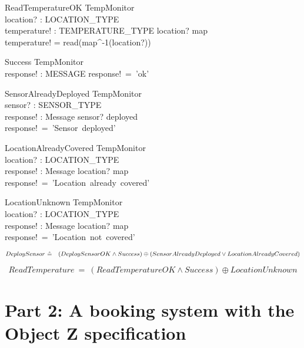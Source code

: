 \documentclass[12pt]{article}
\begin{document}
\begin{schema}{ReadTemperatureOK}
\Xi TempMonitor\\
location? : LOCATION\_TYPE\\
temperature! : TEMPERATURE\_TYPE
\where
location? \in \ran map\\
temperature! = read(map^{-1}(location?))\\
\end{schema}

\begin{schema}{Success}
\Xi TempMonitor\\
response! : MESSAGE
\where
response!~=~'ok'\\
\end{schema}



\begin{schema}{SensorAlreadyDeployed}
\Xi TempMonitor\\
sensor? : SENSOR\_TYPE\\
response! : Message
\ST
sensor? \in deployed\\
response!~=~'Sensor~deployed'
\end{schema}


\begin{schema}{LocationAlreadyCovered}
\Xi TempMonitor\\
location? : LOCATION\_TYPE\\
response! : Message
\ST
location? \in \ran map\\
response!~=~'Location~already~covered'
\end{schema}


\begin{schema}{LocationUnknown}
\Xi TempMonitor\\
location? : LOCATION\_TYPE\\
response! : Message
\ST
location? \notin \ran map\\
response!~=~'Location~not~covered'
\end{schema}

\[ DeploySensor~\hat{=}~\\
~~~(DeploySensorOK \wedge Success) \oplus (SensorAlreadyDeployed \vee LocationAlreadyCovered) \]



\[ ReadTemperature~\hat{=}~(ReadTemperatureOK \wedge Success) \oplus LocationUnknown \]



\newpage



\section*{Part 2:  A booking system with the Object Z specification}
\end{document}
